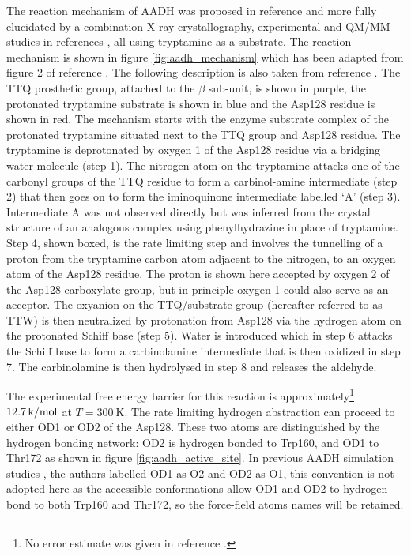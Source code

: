 The reaction mechanism of AADH was proposed in reference \cite{hyunMechanisticStudiesAromatic1995a} and more fully elucidated by a combination X-ray crystallography, experimental and QM/MM studies in references \cite{masgrauAtomicDescriptionEnzyme2006,masgrauTunnelingClassicalPaths2007, ranaghanInitioQMMM2017}, all using tryptamine as a substrate. 
The reaction mechanism is shown in figure \ref{fig:aadh_mechanism} which has been adapted from figure 2 of reference \cite{masgrauAtomicDescriptionEnzyme2006}. The following description is also taken from reference \cite{masgrauAtomicDescriptionEnzyme2006}. The TTQ prosthetic group, attached to the $\beta$ sub-unit, is shown in purple, the protonated tryptamine substrate is shown in blue and the Asp128 residue is shown in red.  The mechanism starts with the enzyme substrate complex of the protonated tryptamine situated next to the TTQ group and Asp128 residue. The tryptamine is deprotonated by oxygen 1 of the Asp128 residue via a bridging water molecule (step 1). The nitrogen atom on the tryptamine attacks one of the carbonyl groups of the TTQ residue to form a carbinol-amine intermediate (step 2) that then goes on to form the iminoquinone intermediate labelled `A' (step 3). Intermediate A was not observed directly but was inferred from the crystal structure of an analogous complex using phenylhydrazine in place of tryptamine. Step 4, shown boxed, is the rate limiting step and involves the tunnelling of a proton from the tryptamine carbon atom adjacent to the nitrogen, to an oxygen atom of the Asp128 residue.  The proton is shown here accepted by oxygen 2 of the Asp128 carboxylate group, but in principle oxygen 1 could also serve as an acceptor. The oxyanion on the TTQ/substrate group (hereafter referred to as TTW) is then neutralized by protonation from Asp128 via the hydrogen atom on the protonated Schiff base (step 5). Water is introduced which in step 6 attacks the Schiff base to form a carbinolamine intermediate that is then oxidized in step 7.  The carbinolamine is then hydrolysed in step 8 and releases the aldehyde.  

The experimental free energy barrier for this reaction is approximately\footnote{No error estimate was given in reference \cite{masgrauAtomicDescriptionEnzyme2006}.} $ \SI{12.7}{\kilo\cal\per\mol}$ at $T=\SI{300}{\kelvin}$. The rate limiting hydrogen abstraction can proceed to either OD1 or OD2 of the Asp128. These two atoms are distinguished by the hydrogen bonding network: OD2 is hydrogen bonded to Trp160, and OD1 to Thr172 as shown in figure \ref{fig:aadh_active_site}. In previous AADH simulation studies \cite{masgrauAtomicDescriptionEnzyme2006,masgrauTunnelingClassicalPaths2007,ranaghanInitioQMMM2017}, the authors labelled OD1 as O2 and OD2 as O1, this convention is not adopted here as the accessible conformations allow OD1 and OD2 to hydrogen bond to both Trp160 and Thr172, so the force-field atoms names will be retained. 

